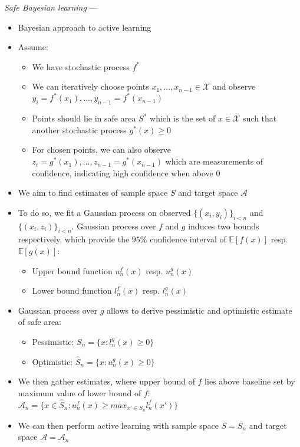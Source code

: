 \emph{Safe Bayesian learning} ---
\begin{itemize}
    \item Bayesian approach to active learning
    \item Assume:
    \begin{itemize}
        \item We have stochastic process $f^*$
        \item We can iteratively choose points $x_1, ..., x_{n-1} \in \mathcal{X}$ and observe $y_i = f^*(x_1), ..., y_{n-1} = f^*(x_{n-1})$
        \item Points should lie in safe area $S^*$ which is the set of $x \in \mathcal{X}$ such that another stochastic process $g^*(x) \geq 0$
        \item For chosen points, we can also observe $z_i = g^*(x_1), ..., z_{n-1} = g^*(x_{n-1})$ which are measurements of confidence, indicating high confidence when above $0$
    \end{itemize}
    \item We aim to find estimates of sample space $S$ and target space $\mathcal{A}$
    \item To do so, we fit a Gaussian process on observed $\{(x_i,y_i)\}_{i<n}$ and $\{(x_i,z_i)\}_{i<n}$. Gaussian process over $f$ and $g$ induces two bounds respectively, which provide the $95\%$ confidence interval of $\mathbb{E}[f(x)]$ resp. $\mathbb{E}[g(x)]$:
    \begin{itemize}
        \item Upper bound function $u_n^f(x)$ resp. $u_n^g(x)$
        \item Lower bound function $l_n^f(x)$ resp. $l_n^g(x)$
    \end{itemize}
    \item Gaussian process over $g$ allows to derive pessimistic and optimistic estimate of safe area:
    \begin{itemize}
        \item Pessimistic: $S_n = \{x: l_n^g(x) \geq 0\}$
        \item Optimistic: $\hat{S}_n = \{x: u_n^g(x) \geq 0\}$
    \end{itemize}
    \item We then gather estimates, where upper bound of $f$ lies above baseline set by maximum value of lower bound of $f$: $\mathcal{A}_n = \{x \in \hat{S}_n : u_n^f(x) \geq max_{x' \in S_n} l_n^f(x')\}$
    \item We can then perform active learning with sample space $S = S_n$ and target space $\mathcal{A} = \mathcal{A}_n$
\end{itemize}

